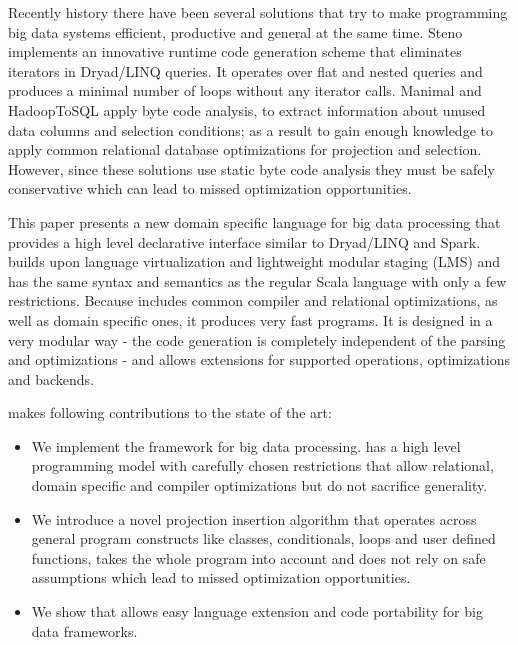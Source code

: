 Recently history there have been several solutions that try to make programming big data systems efficient, productive and general at the same time. Steno \cite{murray_steno:_2011} implements an innovative runtime code generation scheme that eliminates iterators in Dryad/LINQ queries. It operates over flat and nested queries and produces a minimal number of loops without any iterator calls. Manimal \cite{jahani_automatic_2011} and HadoopToSQL \cite{iu_hadooptosql:_2010} apply byte code analysis, to extract information about unused data columns and selection conditions; as a result to gain enough knowledge to apply common relational database optimizations for projection and selection. However, since these solutions use static byte code analysis they must be safely conservative which can lead to missed optimization opportunities.

This paper presents a new domain specific language \tool for big data processing that provides a high level declarative interface similar to Dryad/LINQ and Spark. \tool builds upon language virtualization \cite{moors_scala-virtualized_2012} and lightweight modular staging \cite{rompf_lightweight_2010} (LMS) and has the same syntax and semantics as the regular Scala language with only a few restrictions.
Because \tool includes common compiler and relational optimizations, as well as domain specific ones, it produces very fast programs. It is designed in a very modular way - the code generation is completely independent of the parsing and optimizations - and allows extensions for supported operations, optimizations and backends. 

\tool makes following contributions to the state of the art:    
\begin{itemize}

  \item We implement the \tool framework for big data processing. \tool has a high level programming model with carefully chosen restrictions that allow relational, domain specific and compiler optimizations but do not sacrifice generality.

  \item We introduce a novel projection insertion algorithm that operates across general program constructs like classes, conditionals, loops and user defined functions, takes the whole program into account and does not rely on safe assumptions which lead to missed optimization opportunities.  

  \item We show that \tool allows easy language extension and code portability for big data frameworks. 

\end{itemize} 

